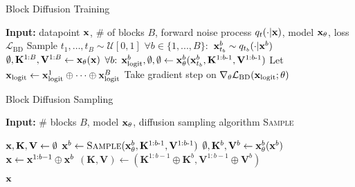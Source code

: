 \begin{multicols}{2}
    \begin{algorithm}[H]
    \caption{Block Diffusion Training}
    \label{alg:sar-train}
    \begin{algorithmic}
    \State \textbf{Input:} datapoint ${\mathbf x}$, \# of blocks $B$, forward noise process $q_t(\cdot|{\mathbf x})$, model ${\mathbf x}_\theta$, loss $\mathcal{L}_{\text{BD}}$
    \Repeat
        \State Sample $t_1, \dots, t_B \sim \mathcal{U}[0, 1]$
        \State $\forall b \in \{1,...,B\}:$ ${\mathbf x}_{t_b}^b \sim q_{t_b}(\cdot|{\mathbf x}^b)$
        \State $\emptyset, \mathbf{K}^{1:B}, \mathbf{V}^{1:B} \gets {\mathbf x}_\theta({\mathbf x})$ 
        \State $\forall b \text{: } {\mathbf x}_\text{logit}^b, \emptyset, \emptyset \gets {\mathbf x}_\theta^b({\mathbf x}_{t_b}^b,  \mathbf{K}^{1:b\text{-}1}, \mathbf{V}^{1:b\text{-}1})$ 
        \State Let ${\mathbf x}_\text{logit} \gets {\mathbf x}_\text{logit}^1 \oplus \dots \oplus {\mathbf x}^B_\text{logit}$
        \State Take gradient step on $\nabla_\theta \mathcal{L}_{\text{BD}}({\mathbf x}_{\text{logit}}; \theta)$
        
    \end{algorithmic}
    \end{algorithm}
    
    \columnbreak
    
    \begin{algorithm}[H]
    \caption{Block Diffusion Sampling}
    \label{alg:sar-inference}
    \begin{algorithmic}
    \State \textbf{Input:} \# blocks $B$, model ${\mathbf x}_\theta$, diffusion sampling algorithm \textsc{Sample}
    \vspace{3pt}
    
    \State ${\mathbf x}, \mathbf{K},\mathbf{V} \gets \emptyset$ 
    \vspace{3pt}
        \State ${\mathbf x}^b \gets \textsc{Sample}({\mathbf x}_\theta^b, \mathbf{K}^{1:b\text{-}1},\mathbf{V}^{1:b\text{-}1})$
        \State $\emptyset, \mathbf{K}^{b}, \mathbf{V}^{b} \gets {\mathbf x}_\theta^b({\mathbf x}^b)$
        \State ${\mathbf x} \gets {\mathbf x}^{1:b-1} \oplus {\mathbf x}^b $
        \State $(\mathbf{K}, \mathbf{V}) \gets (\mathbf{K}^{1:b-1} \oplus \mathbf{K}^b, \mathbf{V}^{1:b-1} \oplus \mathbf{V}^b) $
    \EndFor
    
\State \Return ${\mathbf x}$
\end{algorithmic}
\end{algorithm}
\end{multicols}
    